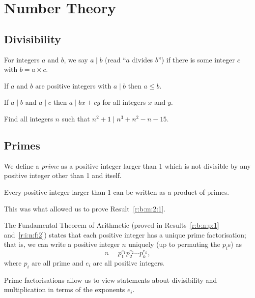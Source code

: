 \section{Number Theory}
\subsection{Divisibility}
  For integers $a$ and $b$, we say $a\mid b$ (read ``$a$ divides
  $b$'') if there is some integer $c$ with $b=a\times c$.
\begin{result}{\label{r:b:n:d:1}}
    If $a$ and $b$ are positive integers with $a\mid b$ then
      $a\le b$.
\end{result}
\begin{result}{\label{r:b:n:d:2}}
    If $a\mid b$ and $a\mid c$ then $a\mid bx+cy$ for all
      integers $x$ and $y$.
\end{result}
\begin{problem}{\label{p:b:n:d:1}}
    Find all integers $n$ such that $n^2+1\mid n^3+n^2-n-15$.
\end{problem}
\subsection{Primes}
  We define a \emph{prime} as a positive integer larger than 1 which is not
  divisible by any positive integer other than 1 and itself.
\begin{result}{\label{r:b:n:p:1}}
  Every positive integer larger than 1 can be written as a product of primes.
\end{result}
This was what allowed us to prove Result~\ref{r:b:m:2:1}.

The Fundamental Theorem of Arithmetic (proved in Results~\ref{r:b:n:p:1}
and~\ref{r:i:n:f:2})
states that each positive integer has a unique prime factorisation; that is,
we can write a positive integer $n$ uniquely (up to permuting the $p_i$s) as
\[n=p_1^{e_1}p_2^{e_2}\cdots p_k^{e_k},\]
where $p_i$ are all prime and $e_i$ are all positive integers.

Prime factorisations allow us to view statements about divisibility and
multiplication in terms of the exponents $e_i$.

